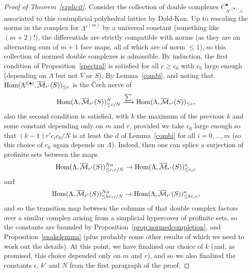 \begin{proof}[Proof of Theorem~\ref{explicit}]
Consider the collection of double complexes $C_{\Lambda'^{(\bullet)},c}^\bullet$ associated to this cosimplicial polyhedral lattice by Dold-Kan. Up to rescaling the norms in the complex for $\Lambda'^{(m)}$ by a universal constant (something like $(m+2)!$), the differentials are strictly compatible with norms (as they are an alternating sum of $m+1$ face maps, all of which are of norm $\leq 1$), so this collection of normed double complexes is admissible. By induction, the first condition of Proposition~\ref{spectral} is satisfied for all $c\geq c_0$ with $c_0$ large enough (depending on $\Lambda$ but not $V$ or $S$). By Lemma~\ref{combi}, and noting that $\operatorname{Hom}(\Lambda'^{(\bullet)},\overline{\mathcal M}_{r'}(S))_{\leq c}$ is the \v{C}ech nerve of
\[
\operatorname{Hom}(\Lambda,\overline{\mathcal M}_{r'}(S))_{\leq c/N}^N\xrightarrow{\sum} \operatorname{Hom}(\Lambda,\overline{\mathcal M}_{r'}(S))_{\leq c},
\]
also the second condition is satisfied, with $k$ the maximum of the previous $k$ and some constant depending only on $m$ and $r$, provided we take $c_0$ large enough so that $(k-1)r'c_ic_0/N$ is at least the $d$ of Lemma~\ref{combi} for all $i=0,\ldots,m$ (so this choice of $c_0$ again depends on $\Lambda$). Indeed, then one can splice a surjection of profinite sets between the maps
\[
\operatorname{Hom}(\Lambda,\overline{\mathcal M}_{r'}(S))_{\leq c_ic/N}^{Na}\to\operatorname{Hom}(\Lambda,\overline{\mathcal M}_{r'}(S))_{\leq c_ic}^a
\]
and
\[
\operatorname{Hom}(\Lambda,\overline{\mathcal M}_{r'}(S))_{\leq kc_ic/N}^{Na}\to \operatorname{Hom}(\Lambda,\overline{\mathcal M}_{r'}(S))_{\leq kc_ic}^a,
\]
and so the transition map between the columns of that double complex factors over a similar complex arising from a simplicial hypercover of profinite sets, so the constants are bounded by Proposition~\ref{prop:normedcompletion},
	and Proposition~\ref{snakelemma}
	(plus probably some other results of which we need to work out the details).
	At this point, we have finalized our choice of $k$ (and, as promised, this choice depended only on $m$ and $r$), and so we also finalized the constants $\epsilon$, $k'$ and $N$ from the first paragraph of the proof.


\end{proof}
